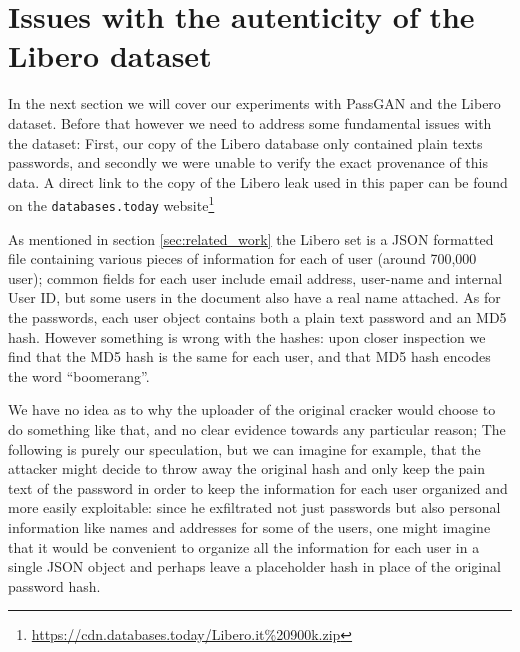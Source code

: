 \section{Issues with the autenticity of the Libero dataset}\label{sec:libero}
In the next section we will cover our experiments with PassGAN and the Libero dataset.
Before that however we need to address some fundamental issues with the dataset: First, our copy of the Libero database only contained plain texts passwords, and secondly we were unable to verify the exact provenance of this data.
A direct link to the copy of the Libero leak used in this paper can be found on the \texttt{databases.today} website\footnote{\url{https://cdn.databases.today/Libero.it\%20900k.zip}}

As mentioned in section \ref{sec:related_work} the Libero set is a JSON formatted file containing various pieces of information for each of user (around 700,000 user); common fields for each user include email address, user-name and internal User ID, but some users in the document also have a real name attached. As for the passwords, each user object contains both a plain text password and an MD5 hash.
However something is wrong with the hashes: upon closer inspection we find that the MD5 hash is the same for each user, and that MD5 hash encodes the word \enquote{boomerang}.

We have no idea as to why the uploader of the original cracker would choose to do something like that, and no clear evidence towards any particular reason; The following is purely our speculation, but we can imagine for example, that the attacker might decide to throw away the original hash and only keep the pain text of the password in order to keep the information for each user organized and more easily exploitable: since he exfiltrated not just passwords but also personal information like names and addresses for some of the users, one might imagine that it would be convenient to organize all the information for each user in a single JSON object and perhaps leave a placeholder hash in place of the original password hash.

